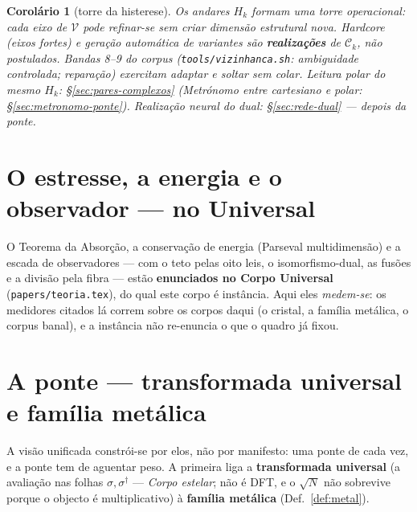 \documentclass[11pt,a4paper]{article}
\newtheorem{corolario}{Corolário}
\newcommand{\code}[1]{\texttt{#1}}
\begin{document}
\begin{corolario}[torre da histerese]\label{cor:torre-histerese}
Os andares $H_k$ formam uma torre operacional: cada eixo de $\mathcal{V}$
pode refinar-se sem criar dimensão estrutural nova. Hardcore (eixos
fortes) e geração automática de variantes são \textbf{realizações} de
$\mathcal{C}_k$, não postulados. Bandas 8--9 do corpus
(\code{tools/vizinhanca.sh}: ambiguidade controlada; reparação) exercitam
adaptar e soltar sem colar. Leitura polar do mesmo $H_k$:
\S\ref{sec:pares-complexos} (Metrónomo entre cartesiano e polar:
\S\ref{sec:metronomo-ponte}). Realização neural do dual:
\S\ref{sec:rede-dual} --- depois da ponte.

\end{corolario}

\section{O estresse, a energia e o observador --- no Universal}\label{sec:instancia-universal}

O Teorema da Absorção, a conservação de energia (Parseval multidimensão)
e a escada de observadores --- com o teto pelas oito leis, o
isomorfismo-dual, as fusões e a divisão pela fibra --- estão
\textbf{enunciados no Corpo Universal} (\code{papers/teoria.tex}),
do qual este corpo é instância. Aqui eles \emph{medem-se}: os medidores
citados lá correm sobre os corpos daqui (o cristal, a família metálica,
o corpus banal), e a instância não re-enuncia o que o quadro já fixou.

\section{A ponte --- transformada universal e família metálica}\label{sec:ponte}

A visão unificada constrói-se por elos, não por manifesto: uma ponte de
cada vez, e a ponte tem de aguentar peso. A primeira liga a
\textbf{transformada universal} (a avaliação nas folhas $\sigma,\sigma^{\dagger}$
--- \emph{Corpo estelar}; não é DFT, e o $\sqrt N$ não sobrevive porque o
objecto é multiplicativo) à \textbf{família metálica}
(Def.~\ref{def:metal}).
\end{document}
